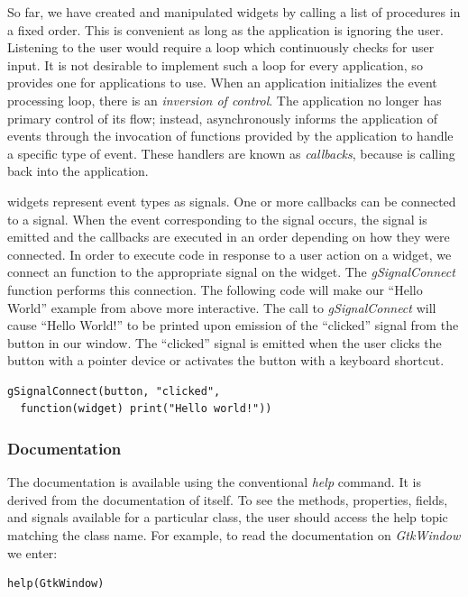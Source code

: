 \documentclass[article]{jss}
\begin{document}
So far, we have created and manipulated widgets by calling a list
of procedures in a fixed order. This is convenient as long as the application
is ignoring the user. Listening to the user would
require a loop which continuously checks for user input.
It is not desirable to implement such a loop for every application, so
 provides one for applications to use. When an application
initializes the  event processing loop, there is an 
\emph{inversion of control}. The application no longer has primary control
of its flow; instead,  asynchronously informs the application of 
events through the invocation of functions provided by the application to 
handle a specific type of event. These handlers are known as 
\emph{callbacks}, because  is calling back into the application. 

 widgets represent event types as signals. One or more
callbacks can be connected to a signal. When the event corresponding to the
signal occurs, the signal is emitted and the callbacks are executed in an order
depending on how they were connected. In order to execute  code in 
response to a user action on a widget, we connect an  function to the 
appropriate signal on the widget.  The \emph{gSignalConnect} function 
performs this connection. The following code will make our ``Hello World'' 
example from above more interactive.
The call to \emph{gSignalConnect} will cause ``Hello World!'' to be printed 
upon emission of the ``clicked'' signal from the button in our window. The 
``clicked'' signal is emitted when the user clicks the button with a pointer
device or activates the button with a keyboard shortcut.
\begin{verbatim}
gSignalConnect(button, "clicked", 
  function(widget) print("Hello world!"))
\end{verbatim}

\subsubsection{Documentation}

The  documentation is available using the conventional  
\emph{help} command. It is derived from the documentation of  itself.
To see the methods, properties, fields, and signals available
for a particular class, the user should access the help topic matching the class name.
For example, to read the documentation on \emph{GtkWindow} we enter:
\begin{verbatim}
help(GtkWindow)
\end{verbatim}
\end{document}
